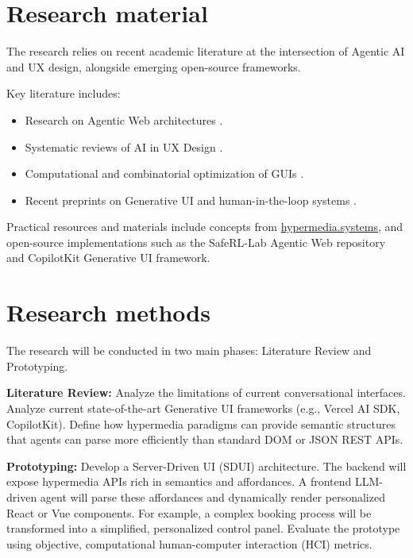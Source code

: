 \documentclass[12pt,a4paper,english,oneside]{article}
\begin{document}
\section{Research material}



The research relies on recent academic literature at the intersection of Agentic AI and UX design, alongside emerging open-source frameworks. 

Key literature includes:
\begin{itemize}
    \item Research on Agentic Web architectures \cite{yang2025agentic}.
    \item Systematic reviews of AI in UX Design \cite{stige2023artificial}.
    \item Computational and combinatorial optimization of GUIs \cite{oulasvirta2020combinatorial}.
    \item Recent preprints on Generative UI and human-in-the-loop systems \cite{leviathan2025generative, mozannar2025magenticui}.
\end{itemize}

Practical resources and materials include concepts from \url{hypermedia.systems}, and open-source implementations such as the SafeRL-Lab Agentic Web repository and CopilotKit Generative UI framework.


\section{Research methods}

The research will be conducted in two main phases: Literature Review and Prototyping.

\textbf{Literature Review:}
Analyze the limitations of current conversational interfaces. Analyze current state-of-the-art Generative UI frameworks (e.g., Vercel AI SDK, CopilotKit).
Define how hypermedia paradigms can provide semantic structures that agents can parse more efficiently than standard DOM or JSON REST APIs. 

\textbf{Prototyping:}
Develop a Server-Driven UI (SDUI) architecture. The backend will expose hypermedia APIs rich in semantics and affordances. A frontend LLM-driven agent will parse these affordances and dynamically render personalized React or Vue components. For example, a complex booking process will be transformed into a simplified, personalized control panel. Evaluate the prototype using objective, computational human-computer interaction (HCI) metrics. 
\end{document}

